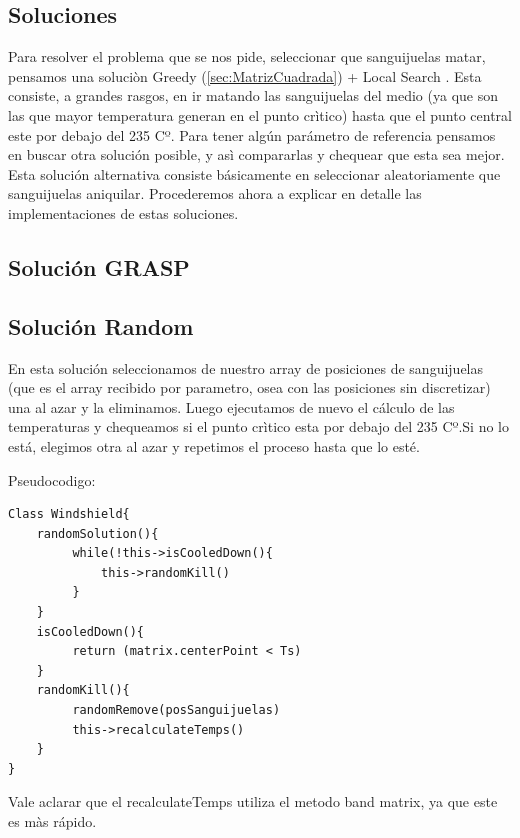 \subsection{Soluciones}

Para resolver el problema que se nos pide, seleccionar que sanguijuelas matar, pensamos una soluciòn Greedy  (\ref{sec:MatrizCuadrada}) + Local Search . Esta consiste, a grandes rasgos, en ir matando las sanguijuelas del medio (ya que son las que mayor temperatura generan en el punto crìtico) hasta que el punto central este por debajo del 235 Cº. Para tener algún parámetro de referencia pensamos en buscar otra solución posible, y asì  compararlas y chequear que esta sea mejor. Esta solución alternativa consiste básicamente en seleccionar aleatoriamente que sanguijuelas aniquilar. Procederemos ahora a explicar en detalle las implementaciones de estas soluciones.

\subsection{Solución GRASP}


\subsection{Solución Random}\label{sec:solucionRandom}


En esta solución seleccionamos de nuestro array de posiciones de sanguijuelas (que es el array recibido por parametro, osea con las posiciones sin discretizar) una al azar y la eliminamos. Luego ejecutamos de nuevo el cálculo de las temperaturas y chequeamos si el punto crìtico esta por debajo del 235 Cº.Si no lo está, elegimos otra al azar y repetimos el proceso hasta que lo esté. 

Pseudocodigo:

\begin{verbatim}
Class Windshield{
    randomSolution(){
         while(!this->isCooledDown(){
             this->randomKill()
         }
    } 
    isCooledDown(){
         return (matrix.centerPoint < Ts)
    }
    randomKill(){
         randomRemove(posSanguijuelas)
         this->recalculateTemps()
    }
}
\end{verbatim}

Vale aclarar que el recalculateTemps utiliza el metodo band matrix, ya que este es màs rápido.










